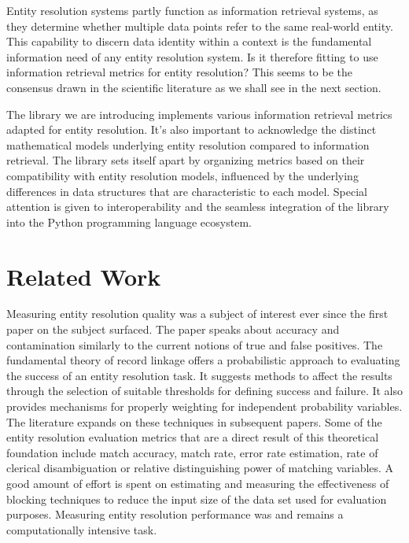 \documentclass[11pt]{article}
\begin{document}
    Entity resolution systems partly function as information retrieval systems,
    as they determine whether multiple data points refer to the same real-world
    entity.
    This capability to discern data identity within a context is the fundamental
    information need of any entity resolution system.
    Is it therefore fitting to use information retrieval metrics for entity
    resolution?
    This seems to be the consensus drawn in the scientific literature as we
    shall see in the next section.

    The library we are introducing implements various information retrieval
    metrics adapted for entity resolution.
    It's also important to acknowledge the distinct mathematical models
    underlying entity resolution compared to information retrieval.
    The library sets itself apart by organizing metrics based on their
    compatibility with entity resolution models, influenced by the underlying
    differences in data structures that are characteristic to each model.
    Special attention is given to interoperability and the seamless integration
    of the library into the Python programming language ecosystem.

    \section{Related Work}\label{sec:related}

    Measuring entity resolution quality was a subject of interest ever since the
    first paper on the subject surfaced\cite{newcombe1959}.
    The paper speaks about accuracy and contamination similarly to the current
    notions of true and false positives.
    The fundamental theory of record linkage\cite{fs1969} offers a probabilistic
    approach to evaluating the success of an entity resolution task.
    It suggests methods to affect the results through the selection of suitable
    thresholds for defining success and failure.
    It also provides mechanisms for properly weighting for independent
    probability variables.
    The literature expands on these techniques in subsequent
    papers\cite{winkler1990}.
    Some of the entity resolution evaluation metrics that are a direct result of
    this theoretical foundation include match accuracy, match
    rate\cite{jaro1989advances}, error rate estimation, rate of clerical
    disambiguation\cite{winkler1990} or relative distinguishing
    power of matching variables\cite{winkler2014}.
    A good amount of effort is spent on estimating and measuring the
    effectiveness of blocking techniques to reduce the input size of the data
    set used for evaluation purposes\cite{winkler1990,jaro1989advances}.
    Measuring entity resolution performance was and remains a computationally
    intensive task.
    
\end{document}
